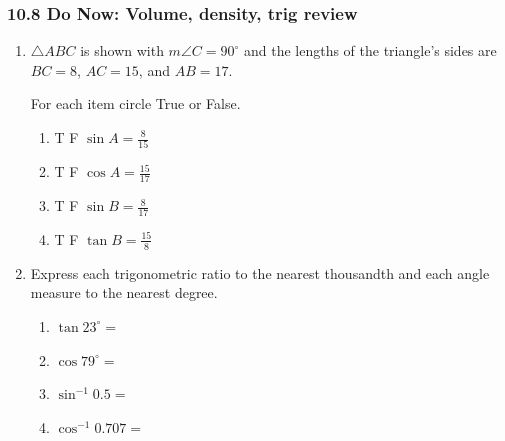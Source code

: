 \documentclass[12pt, twoside]{article}
\begin{document}
\subsubsection*{10.8 Do Now: Volume, density, trig review}
 \begin{enumerate}

   \item $\triangle ABC$ is shown with $m\angle C=90^\circ$ and the lengths of the triangle's sides are $BC=8$, $AC=15$, and $AB=17$.
      \begin{center}
       \end{center}
        For each item circle True or False.
        \begin{multicols}{2}
         \begin{enumerate}
         \item \quad T \qquad F \qquad $\displaystyle \sin A = \frac{8}{15}$ \vspace{0.25cm}
         \item \quad T \qquad F \qquad $\displaystyle \cos A = \frac{15}{17}$
         \item \quad T \qquad F \qquad $\displaystyle \sin B = \frac{8}{17}$ \vspace{0.25cm}
         \item \quad T \qquad F \qquad $\displaystyle \tan B = \frac{15}{8}$
       \end{enumerate}
     \end{multicols}
  \vspace{1.25cm}

  \item Express each trigonometric ratio to the nearest thousandth and each angle measure to the nearest degree.
    \begin{multicols}{2}
      \begin{enumerate}
        \item $\tan 23^\circ =$ \vspace{0.5cm}
        \item $\cos 79^\circ =$
        \item $\sin^{-1} 0.5 =$ \vspace{0.5cm}
        \item $\cos^{-1} 0.707 =$
      \end{enumerate}
    \end{multicols} \vspace{1.25cm}


\end{enumerate}
\end{document}
